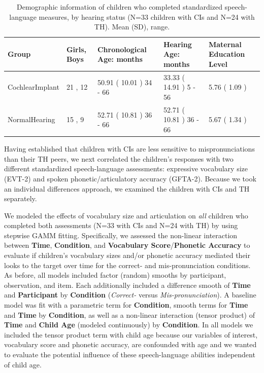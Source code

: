 \documentclass[
]{article}
\begin{document}
\begin{table}[!h]

\caption{\label{tab:demo-tab-allkids}Demographic information of children who completed standardized speech-language measures, by hearing status (N=33 children with CIs and N=24 with TH). Mean (SD), range.}
\centering
\begin{tabular}[t]{lllll}
\toprule
Group & Girls, Boys & Chronological Age: months & Hearing Age: months & Maternal Education Level\\
\midrule
CochlearImplant & 21 , 12 & 50.91 ( 10.01 ) 34 - 66 & 33.33 ( 14.91 ) 5 - 56 & 5.76 ( 1.09 )\\
NormalHearing & 15 , 9 & 52.71 ( 10.81 ) 36 - 66 & 52.71 ( 10.81 ) 36 - 66 & 5.67 ( 1.34 )\\
\bottomrule
\end{tabular}
\end{table}

Having established that children with CIs are less sensitive to mispronunciations than their TH peers, we next correlated the children's responses with two different standardized speech-language assessments: expressive vocabulary size (EVT-2) and spoken phonetic/articulatory accuracy (GFTA-2). Because we took an individual differences approach, we examined the children with CIs and TH separately.

We modeled the effects of vocabulary size and articulation on \emph{all} children who completed both assessments (N=33 with CIs and N=24 with TH) by using stepwise GAMM fitting. Specifically, we assessed the non-linear interaction between \textbf{Time}, \textbf{Condition}, and \textbf{Vocabulary Score}/\textbf{Phonetic Accuracy} to evaluate if children's vocabulary sizes and/or phonetic accuracy mediated their looks to the target over time for the correct- and mis-pronunciation conditions. As before, all models included factor (random) smooths by participant, observation, and item. Each additionally included a difference smooth of \textbf{Time} and \textbf{Participant} by \textbf{Condition} (\emph{Correct-} versus \emph{Mis-pronunciation}). A baseline model was fit with a parametric term for \textbf{Condition}, smooth terms for \textbf{Time} and \textbf{Time} by \textbf{Condition}, as well as a non-linear interaction (tensor product) of \textbf{Time} and \textbf{Child Age} (modeled continuously) by \textbf{Condition}. In all models we included the tensor product term with child age because our variables of interest, vocabulary score and phonetic accuracy, are confounded with age and we wanted to evaluate the potential influence of these speech-language abilities independent of child age.
\end{document}
